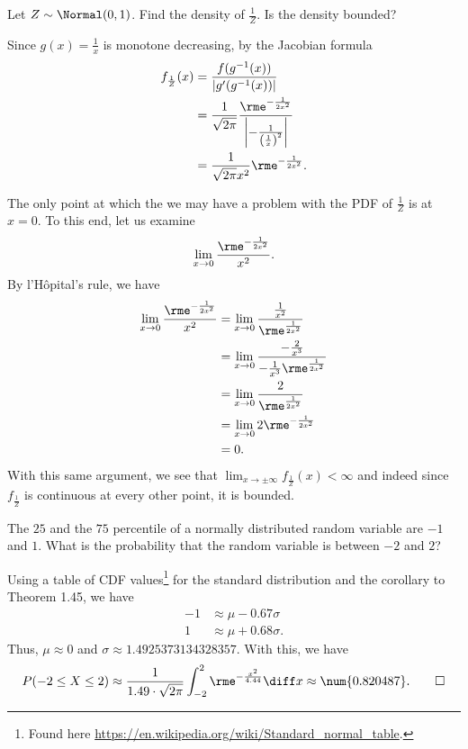 \begin{problem}[Handout 13, \# 21]
  Let \(Z\sim\Normal(0,1)\). Find the density of \(\frac{1}{Z}\). Is the
  density bounded?
\end{problem}
\begin{solution}
  Since \(g(x)=\frac{1}{x}\) is monotone decreasing, by the Jacobian
  formula
  \begin{align*}
    f_{\frac{1}{Z}}(x)
    &=\frac{f(g^{-1}(x))}{|g'(g^{-1}(x))|}\\
    &=\frac{1}{\sqrt{2\pi}}
      \frac{\rme^{-\frac{1}{2x^2}}}{\left|-\frac{1}{\left(\frac{1}{x}\right)^2}
      \right|}\\
    &=\frac{1}{\sqrt{2\pi}x^2}\rme^{-\frac{1}{2x^2}}.
  \end{align*}

  The only point at which the we may have a problem with the PDF of
  \(\frac{1}{Z}\) is at \(x=0\). To this end, let us examine
  \[
    \lim_{x\to 0}\frac{\rme^{-\frac{1}{2x^2}}}{x^2}.
  \]
  By l'Hôpital's rule, we have
  \begin{align*}
    \lim_{x\to 0}\frac{\rme^{-\frac{1}{2x^2}}}{x^2}
    &=\lim_{x\to 0}\frac{\frac{1}{x^2}}{\rme^{\frac{1}{2x^2}}}\\
    &=\lim_{x\to 0}\frac{-\frac{2}{x^3}}{-\frac{1}{x^3}\rme^{\frac{1}{2x^2}}}\\
    &=\lim_{x\to 0}\frac{2}{\rme^{\frac{1}{2x^2}}}\\
    &=\lim_{x\to 0} 2\rme^{-\frac{1}{2x^2}}\\
    &=0.
  \end{align*}
  With this same argument, we see that \(\lim_{x\to\pm\infty}
  f_{\frac{1}{Z}}(x)<\infty\) and indeed since \(f_{\frac{1}{Z}}\) is
  continuous at every other point, it is bounded.
\end{solution}
\newpage

\begin{problem}[Handout 13, \# 22]
  The \(25\) and the \(75\) percentile of a
  normally distributed random variable are \(-1\) and \(1\). What is the
  probability that the random variable is between \(-2\) and \(2\)?
\end{problem}
\begin{solution}
  Using a table of CDF values\footnote{Found here
    \url{https://en.wikipedia.org/wiki/Standard_normal_table}.} for the
  standard distribution and the corollary to Theorem 1.45, we have
  \begin{align*}
    -1&\approx \mu-0.67\sigma\\
    1&\approx \mu+0.68\sigma.
  \end{align*}
  Thus, \(\mu\approx 0\) and
  \(\sigma\approx\num{1.4925373134328357}\). With this, we have
  \[
    P(-2\leq X\leq 2)
    \approx\frac{1}{1.49\cdot\sqrt{2\pi}}\int_{-2}^2\rme^{-\frac{x^2}{4.44}}\diff
    x
    \approx\num{0.820487}.\qedhere
  \]
\end{solution}

